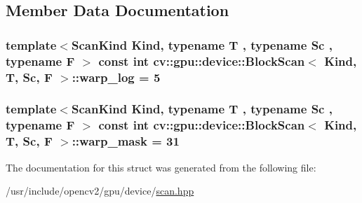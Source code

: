 \subsection{Member Data Documentation}
\hypertarget{structcv_1_1gpu_1_1device_1_1BlockScan_a104541f77d6c80b161733957c37721b5}{
\subsubsection[{warp\-\_\-log}]{\setlength{\rightskip}{0pt plus 5cm}template$<$Scan\-Kind Kind, typename T , typename Sc , typename F $>$ const int {\bf cv\-::gpu\-::device\-::\-Block\-Scan}$<$ Kind, {\bf T}, Sc, {\bf F} $>$\-::warp\-\_\-log = 5\hspace{0.3cm}{\ttfamily [static]}}}\label{structcv_1_1gpu_1_1device_1_1BlockScan_a104541f77d6c80b161733957c37721b5}
\hypertarget{structcv_1_1gpu_1_1device_1_1BlockScan_a098c5d001b3d26bcf2712f5cc2bbe6a8}{
\subsubsection[{warp\-\_\-mask}]{\setlength{\rightskip}{0pt plus 5cm}template$<$Scan\-Kind Kind, typename T , typename Sc , typename F $>$ const int {\bf cv\-::gpu\-::device\-::\-Block\-Scan}$<$ Kind, {\bf T}, Sc, {\bf F} $>$\-::warp\-\_\-mask = 31\hspace{0.3cm}{\ttfamily [static]}}}\label{structcv_1_1gpu_1_1device_1_1BlockScan_a098c5d001b3d26bcf2712f5cc2bbe6a8}


The documentation for this struct was generated from the following file\-:\begin{DoxyCompactItemize}
\item 
/usr/include/opencv2/gpu/device/\hyperlink{scan_8hpp}{scan.\-hpp}\end{DoxyCompactItemize}
